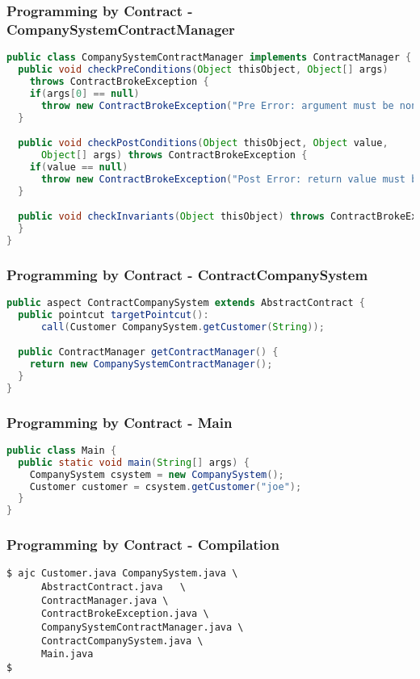 \documentclass[11pt]{beamer}
\begin{document}
\begin{frame}[fragile]
   \frametitle{Programming by Contract - CompanySystemContractManager}
{\tiny
\begin{lstlisting}[language=java]
public class CompanySystemContractManager implements ContractManager {
  public void checkPreConditions(Object thisObject, Object[] args)
    throws ContractBrokeException {
    if(args[0] == null)
      throw new ContractBrokeException("Pre Error: argument must be non-null");
  }

  public void checkPostConditions(Object thisObject, Object value,
      Object[] args) throws ContractBrokeException {
    if(value == null)
      throw new ContractBrokeException("Post Error: return value must be non-null");
  }

  public void checkInvariants(Object thisObject) throws ContractBrokeException {
  }
}
\end{lstlisting}}
\end{frame}

\begin{frame}[fragile]
   \frametitle{Programming by Contract - ContractCompanySystem}
{\scriptsize
\begin{lstlisting}[language=java]
public aspect ContractCompanySystem extends AbstractContract {
  public pointcut targetPointcut():
      call(Customer CompanySystem.getCustomer(String));

  public ContractManager getContractManager() {
    return new CompanySystemContractManager();
  }
}
\end{lstlisting}}
\end{frame}

\begin{frame}[fragile]
   \frametitle{Programming by Contract - Main}
{\scriptsize
\begin{lstlisting}[language=java]
public class Main {
  public static void main(String[] args) {
    CompanySystem csystem = new CompanySystem();
    Customer customer = csystem.getCustomer("joe");
  }
}
\end{lstlisting}}
\end{frame}

\begin{frame}[fragile]
   \frametitle{Programming by Contract - Compilation}
{\scriptsize
\begin{lstlisting}
$ ajc Customer.java CompanySystem.java \
      AbstractContract.java   \
      ContractManager.java \
      ContractBrokeException.java \
      CompanySystemContractManager.java \
      ContractCompanySystem.java \
      Main.java
$ 
\end{lstlisting}}
\end{frame}
\end{document}
